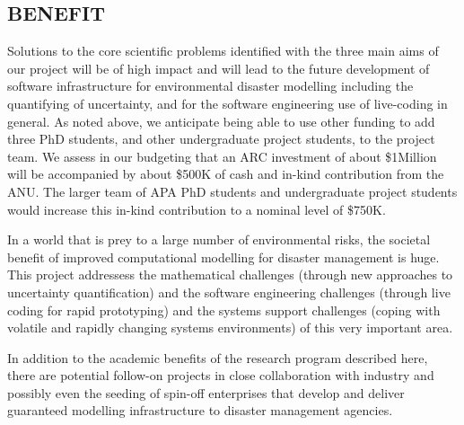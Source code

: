 \subsection*{BENEFIT}


Solutions to the core scientific problems identified with the three main aims of our project will be of high impact and will lead to the future development of  software infrastructure for environmental disaster modelling including the quantifying of uncertainty, and for the software engineering use of live-coding in general. As noted above, we anticipate being able to use other funding to add three PhD students, and other undergraduate project students, to the project team. We assess in our budgeting that an ARC investment of about  \$1Million will be accompanied by about  \$500K of cash and in-kind contribution from the ANU. The larger team of APA PhD students and undergraduate project students would increase this in-kind contribution to a nominal level of \$750K. 
  

In a world that is prey to a large number of environmental risks,
the societal benefit of improved computational modelling for disaster management is huge.
This project addressess the mathematical challenges (through new approaches
to uncertainty quantification) and the software engineering challenges (through live coding
 for rapid prototyping) and the systems support challenges (coping with volatile and 
 rapidly changing systems environments) of this very important area.
 
In addition to the academic benefits of the research program described here, there are potential follow-on projects in close
collaboration with industry and possibly even the seeding of spin-off enterprises that develop and deliver guaranteed modelling infrastructure to disaster management
agencies.

\iffalse
This research is aims to unlock the power of sophisticated
computational simulation incorporating uncertainty for
\emph{interactive} use.  Although we concentrate our research on
simulation support for disaster response, the ultimate potential of
this work is to eventually empower domain experts from a broad range
of areas to better use the high-performance computing power which is
now available to them. We envision a future where performing a complex
flood model or disaster simulation is as interactive and \emph{alive}
as flicking through photos on a tablet.\\



There are several benefits arising from the successful completion of
this project. They include, economic, societal as well as
environmental along with the generation of new knowledge:
\begin{itemize}
\item Reduced economic losses from disasters such as flooding
\item Reduced property damage from disasters
\item Reduced loss of life from disasters
\item New knowledge in the understanding of disaster modelling, and
  hence forecasting.
\end{itemize}
\fi